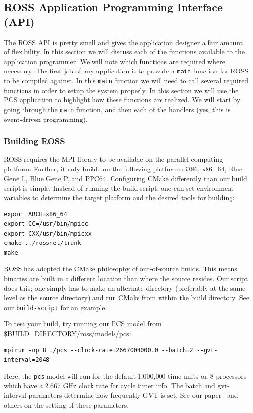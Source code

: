 \documentclass[12pt]{article}
\begin{document}
\subsection{ROSS Application Programming Interface (API)}
The ROSS API is pretty small and gives the application designer a fair
amount of flexibility.  In this section we will discuss each of the
functions available to the application programmer.  We will note which
functions are required where necessary.  The first job of any
application is to provide a {\tt main} function for ROSS to be compiled
against.  In this {\tt main} function we will need to call several required
functions in order to setup the system properly.  In this section we
will use the PCS application to highlight how these functions are
realized.  We will start by going through the {\tt main} function, and then
each of the handlers (yes, this is event-driven programming).

\subsubsection{Building ROSS}
ROSS requires the MPI library to be available on the parallel
computing platform. Further, it only builds on the following platforms:
i386, x86\_64, Blue Gene L, Blue Gene P, and PPC64.  Configuring CMake
differently than our build script is simple.  Instead of running the
build script, one can set environment variables to determine the target
platform and the desired tools for building:

\begin{verbatim}
export ARCH=x86_64
export CC=/usr/bin/mpicc
export CXX/usr/bin/mpicxx
cmake ../rossnet/trunk
make
\end{verbatim}

ROSS has adopted the CMake philosophy of out-of-source builds.  This means
binaries are built in a different location than where the source resides.  Our
script does this; one simply has to make an alternate directory (preferably
at the same level as the source directory) and run CMake from within the
build directory.  See our {\tt build-script} for an example.

To test your build, try running our PCS model from
\${BUILD\_DIRECTORY}/ross/models/pcs:
\begin{verbatim}
mpirun -np 8 ./pcs --clock-rate=2667000000.0 --batch=2 --gvt-interval=2048
\end{verbatim}

Here, the {\tt pcs} model will run for the default 1,000,000 time units on 8
processors which have a 2.667 GHz clock rate for cycle timer info.  The batch
and gvt-interval parameters determine how frequently GVT is set. See our
paper~\cite{carothers-jpdc-2002} and others on the setting of these
parameters.
\end{document}
